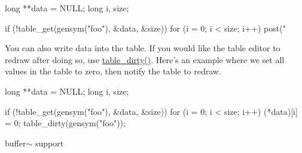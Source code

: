 \begin{DoxyCode}
    long **data = NULL;
    long i, size;

        if (!table_get(gensym("foo"), &data, &size)) {
            for (i = 0;  i < size; i++) {
                post("%
            }
        }
\end{DoxyCode}


You can also write data into the table. If you would like the table editor to redraw after doing so, use \hyperlink{group__tables_gaa72449d4792a6108489ef63c5f5ba7a3}{table\_\-dirty()}. Here's an example where we set all values in the table to zero, then notify the table to redraw.


\begin{DoxyCode}
    long **data = NULL;
    long i, size;

        if (!table_get(gensym("foo"), &data, &size)) {
            for (i = 0;  i < size; i++) {
                (*data)[i]  = 0;
            }
            table_dirty(gensym("foo"));
        }
\end{DoxyCode}


buffer$\sim$ support 